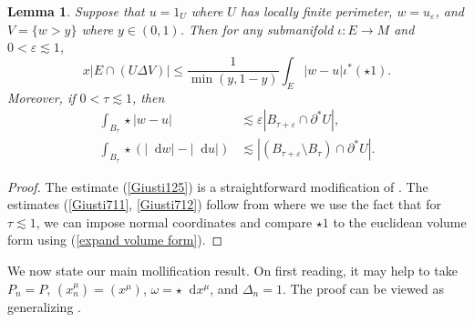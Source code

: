\documentclass[reqno,10pt]{amsart}
\newcommand*\dif{\mathop{}\!\mathrm{d}}
\newtheorem{lemma}[theorem]{Lemma}
\theoremstyle{definition}
\numberwithin{equation}{section}
\begin{document}
\begin{lemma}
Suppose that $u = 1_U$ where $U$ has locally finite perimeter, $w = u_\varepsilon$, and $V = \{w > y\}$ where $y \in (0, 1)$.
Then for any submanifold $\iota: E \to M$ and $0 < \varepsilon \lesssim 1$,
\begin{equation}\label{Giusti125}
x|E \cap (U \Delta V)| \leq \frac{1}{\min(y, 1 - y)} \int_E |w - u| \iota^*(\star 1).
\end{equation}
Moreover, if $0 < \tau \lesssim 1$, then
\begin{align}
\int_{B_\tau} \star |w - u| &\lesssim \varepsilon |B_{\tau + \varepsilon} \cap \partial^* U|, \label{Giusti711}\\
\int_{B_\tau} \star (|\dif w| - |\dif u|) &\lesssim |(B_{\tau + \varepsilon} \setminus B_\tau) \cap \partial^* U|. \label{Giusti712}
\end{align}
\end{lemma}
\begin{proof}
The estimate (\ref{Giusti125}) is a straightforward modification of \cite[Lemma 1.25]{Giusti77}.
The estimates (\ref{Giusti711}, \ref{Giusti712}) follow from \cite[Lemma 7.2]{Giusti77} where we use the fact that for $\tau \lesssim 1$, we can impose normal coordinates and compare $\star 1$ to the euclidean volume form using (\ref{expand volume form}).
\end{proof}

We now state our main mollification result.
On first reading, it may help to take $P_n = P$, $(x^\mu_n) = (x^\mu)$, $\omega = \star \dif x^\mu$, and $\Delta_n = 1$.
The proof can be viewed as generalizing \cite[Lemma 7.5]{Giusti77}.
\end{document}
